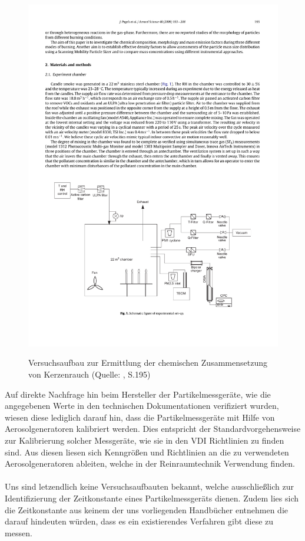 \begin{figure}[H]
	\myfloatalign
	{\includegraphics[width=.9\linewidth]{gfx/related/kerze_versuch.pdf}} \quad
	\caption[Versuchsaufbau zur Ermittlung der chemischen Zusammensetzung von Kerzenrauch (Quelle: \cite{candle}, S.195)]
	{Versuchsaufbau zur Ermittlung der chemischen Zusammensetzung von Kerzenrauch (Quelle: \cite{candle}, S.195)}
	\label{fig:kerze_exp}
\end{figure} 

Auf direkte Nachfrage hin beim Hersteller der Partikelmessger\"{a}te, wie die angegebenen Werte in den technischen Dokumentationen verifiziert wurden, wiesen diese lediglich darauf hin, dass die Partikelmessger\"{a}te mit Hilfe von Aerosolgeneratoren kalibriert werden. Dies entspricht der Standardvorgehensweise zur Kalibrierung solcher Messger\"{a}te, wie sie in den VDI Richtlinien zu finden sind. Aus diesen liesen sich Kenngr\"{o}{\ss}en und Richtlinien an die zu verwendeten Aerosolgeneratoren ableiten, welche in der Reinraumtechnik Verwendung finden.
\\\\
Uns sind letzendlich keine Versuchsaufbauten bekannt, welche ausschlie{\ss}lich zur Identifizierung der Zeitkonstante eines Partikelmessger\"{a}ts dienen. Zudem lies sich die Zeitkonstante aus keinem der uns vorliegenden Handb\"{u}cher entnehmen die darauf hindeuten w\"{u}rden, dass es ein existierendes Verfahren gibt diese zu messen. 